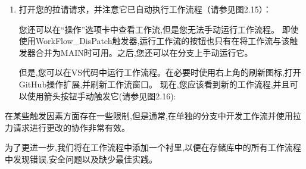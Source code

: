 \begin{enumerate}
\begin{shell}
$ git push -u origin new-workflow
\end{shell}

\item 
接下来,我们将为我们的新分支机构创建拉动请求。当我们使用pull\_request触发器时,这将自动运行我们的新工作流程。转到您的浏览器中的存储库,然后导航以拉出请求。git将检测到您已经推出了一个新分支,并将为您提供创建拉动请求的选项(比较和拉请请求,请参见图2.13):

\myGraphic{0.4}{content/chapter2/images/13.png}{图2.13 --- 在浏览器中创建一个新的pull请求}

只需要保留默认的标题（你之前添加的提交信息），然后点击Create pull request（见图2.14）：

\myGraphic{0.4}{content/chapter2/images/14.png}{图2.14 --- 创建带有标题和描述的拉取请求}

您还可以使用GitHub CLI创建拉动请求：

\begin{shell}
$ gh pr create --fill
\end{shell}

\begin{myTip}{GitHub CLI}
在整本书中,我们将使用github cli(\url{https://cli.github.com/})。它适用于所有平台和许多包装管理器(Homebrew,Winget,RPM等)。有关更多安装说明,请参见\url{https://github.com/cli/cli/cli#installation}。安装后,您必须使用gh auth login登录(请参阅\url{https://cli.github.com/manual/gh_auth_login})进行身份验证。
\end{myTip}

\item 
打开您的拉请请求，并注意它已自动执行工作流程（请参见图2.15）：


您还可以在“操作”选项卡中查看工作流,但是您无法手动运行工作流程。 即使使用WorkFlow\_DisPatch触发器,运行工作流的按钮也只有在将工作流与该触发器合并为MAIN时可用。之后,您还可以在分支上手动运行它。

但是,您可以在VS代码中运行工作流程。在必要时使用右上角的刷新图标,打开GitHub操作扩展,并刷新工作流窗口。 现在,您应该看到新的工作流程,并且可以使用箭头按钮手动触发它(请参见图2.16):

\end{enumerate}


在某些触发因素方面存在一些限制,但是通常,在单独的分支中开发工作流并使用拉力请求进行更改的协作非常有效。


为了更进一步,我们将在工作流程中添加一个衬里,以便在存储库中的所有工作流程中发现错误,安全问题以及缺少最佳实践。